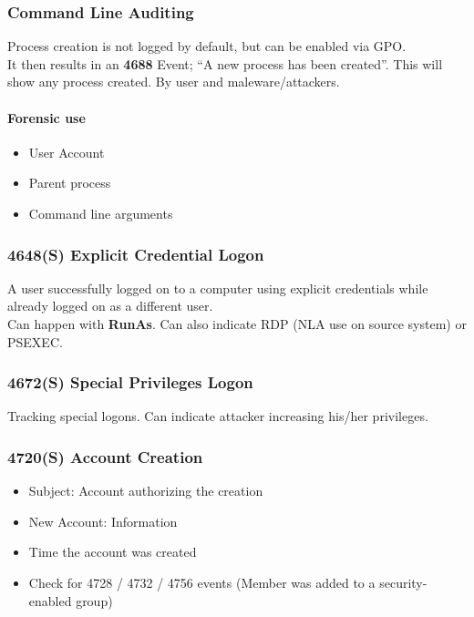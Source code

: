 \subsubsection{Command Line Auditing}
Process creation is not logged by default, but can be enabled via GPO.\\

It then results in an \textbf{4688} Event; ``A new process has been created''.
This will show any process created. By user and maleware/attackers.

\paragraph{Forensic use}
\begin{itemize}
  \item User Account
  \item Parent process
  \item Command line arguments
\end{itemize}

\subsubsection{4648(S) Explicit Credential Logon}
A user successfully logged on to a computer using explicit credentials while already logged on as a different user. \\
Can happen with \textbf{RunAs}. Can also indicate RDP (NLA use on source system) or PSEXEC. 

\subsubsection{4672(S) Special Privileges Logon}
Tracking special logons. Can indicate attacker increasing his/her privileges. 

\subsubsection{4720(S) Account Creation}
\begin{itemize}
  \item Subject: Account authorizing the creation
  \item New Account: Information
  \item Time the account was created
  \item Check for 4728 / 4732 / 4756 events (Member was added to a security-enabled group)
\end{itemize}

